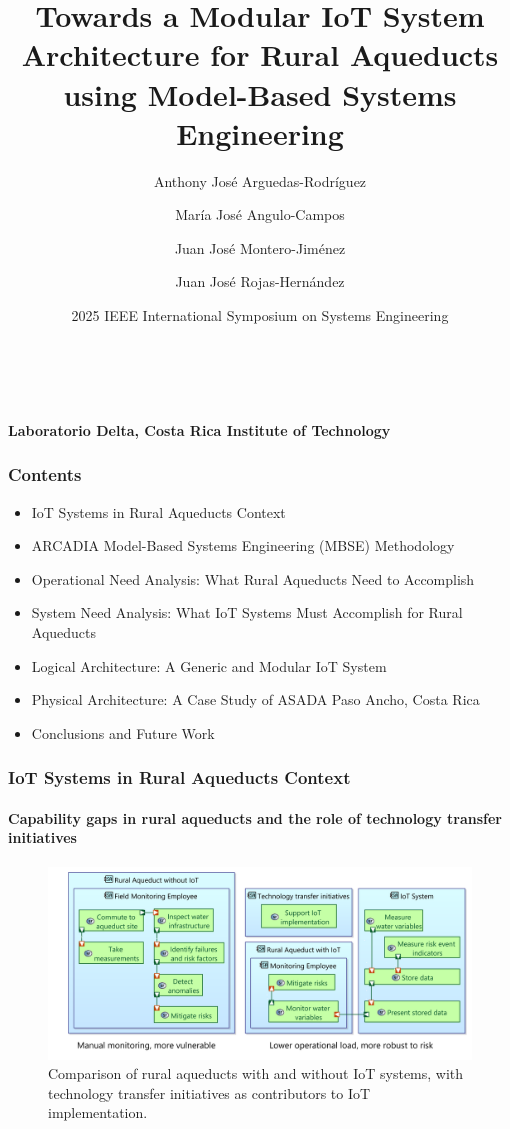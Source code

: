 \documentclass{beamer}
\title[IoT for Rural Aqueducts using MBSE]{Towards a Modular IoT System Architecture for Rural Aqueducts using Model-Based Systems Engineering}
\author[Laboratorio Delta]{Anthony José Arguedas-Rodríguez \and María José Angulo-Campos \and Juan José Montero-Jiménez \and Juan José Rojas-Hernández}
\date{2025 IEEE International Symposium on Systems Engineering}
\begin{document}
\begin{frame}
    \begin{center}
        {\LARGE \textbf{\inserttitle}} \\
        \vspace{0.5cm}
        {\insertauthor} \\
        \vspace{0.25cm}
        {\small \textbf{Laboratorio Delta, Costa Rica Institute of Technology}} \\
        \vspace{0.5cm}
        {\insertdate}
    \end{center}
\end{frame}

\begin{frame}
    \frametitle{Contents}
    \begin{itemize}
        \item IoT Systems in Rural Aqueducts Context
        \item ARCADIA Model-Based Systems Engineering (MBSE) Methodology
        \item Operational Need Analysis: What Rural Aqueducts Need to Accomplish
        \item System Need Analysis: What IoT Systems Must Accomplish for Rural Aqueducts
        \item Logical Architecture: A Generic and Modular IoT System
        \item Physical Architecture: A Case Study of ASADA Paso Ancho, Costa Rica
        \item Conclusions and Future Work
    \end{itemize}
\end{frame}

\begin{frame}
    \frametitle{\small IoT Systems in Rural Aqueducts Context}
    \framesubtitle{Capability gaps in rural aqueducts and the role of technology transfer initiatives}

    \begin{figure}
        \centering
        \includegraphics[width=\textwidth]{images/before_and_after_iot.png}
        \caption{Comparison of rural aqueducts with and without IoT systems, with technology transfer initiatives as contributors to IoT implementation.}
    \end{figure}
\end{frame}
\end{document}
